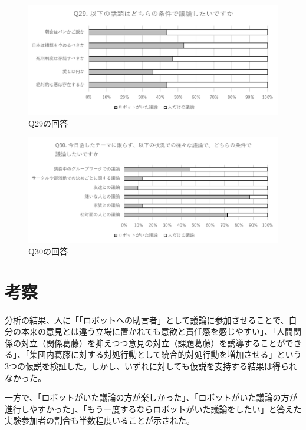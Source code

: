 \documentclass[11pt, a4paper]{jreport} %
\begin{document}
\begin{figure}[htbp]
\begin{center}
\includegraphics[width=150mm]{images/jikken3_29.png}
\caption{Q29の回答}
\label{fig:jikken3_29}
\end{center}
\end{figure}

\begin{figure}[htbp]
\begin{center}
\includegraphics[width=150mm]{images/jikken3_30.png}
\caption{Q30の回答}
\label{fig:jikken3_30}
\end{center}
\end{figure}


\section{考察}
分析の結果、人に「「ロボットへの助言者」として議論に参加させることで、自分の本来の意見とは違う立場に置かれても意欲と責任感を感じやすい」、「人間関係の対立（関係葛藤）を抑えつつ意見の対立（課題葛藤）を誘導することができる」、「集団内葛藤に対する対処行動として統合的対処行動を増加させる」という3つの仮説を検証した。しかし、いずれに対しても仮説を支持する結果は得られなかった。


一方で、「ロボットがいた議論の方が楽しかった」、「ロボットがいた議論の方が進行しやすかった」、「もう一度するならロボットがいた議論をしたい」と答えた実験参加者の割合も半数程度いることが示された。
\end{document}

